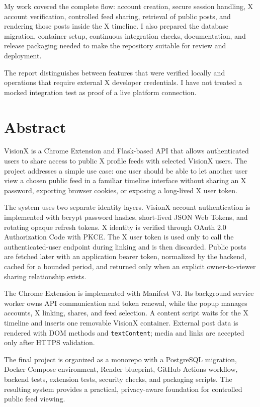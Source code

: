 \documentclass[11pt,a4paper]{report}
\newcommand{\code}[1]{\texttt{#1}}
\begin{document}
My work covered the complete flow: account creation, secure session handling,
X account verification, controlled feed sharing, retrieval of public posts,
and rendering those posts inside the X timeline. I also prepared the database
migration, container setup, continuous integration checks, documentation, and
release packaging needed to make the repository suitable for review and
deployment.

The report distinguishes between features that were verified locally and
operations that require external X developer credentials. I have not treated a
mocked integration test as proof of a live platform connection.

\chapter*{Abstract}
VisionX is a Chrome Extension and Flask-based API that allows authenticated
users to share access to public X profile feeds with selected VisionX users.
The project addresses a simple use case: one user should be able to let another
user view a chosen public feed in a familiar timeline interface without
sharing an X password, exporting browser cookies, or exposing a long-lived X
user token.

The system uses two separate identity layers. VisionX account authentication is
implemented with bcrypt password hashes, short-lived JSON Web Tokens, and
rotating opaque refresh tokens. X identity is verified through OAuth 2.0
Authorization Code with PKCE. The X user token is used only to call the
authenticated-user endpoint during linking and is then discarded. Public posts
are fetched later with an application bearer token, normalized by the backend,
cached for a bounded period, and returned only when an explicit owner-to-viewer
sharing relationship exists.

The Chrome Extension is implemented with Manifest V3. Its background service
worker owns API communication and token renewal, while the popup manages
accounts, X linking, shares, and feed selection. A content script waits for the
X timeline and inserts one removable VisionX container. External post data is
rendered with DOM methods and \code{textContent}; media and links are accepted
only after HTTPS validation.

The final project is organized as a monorepo with a PostgreSQL migration,
Docker Compose environment, Render blueprint, GitHub Actions workflow, backend
tests, extension tests, security checks, and packaging scripts. The resulting
system provides a practical, privacy-aware foundation for controlled public
feed viewing.
\end{document}
